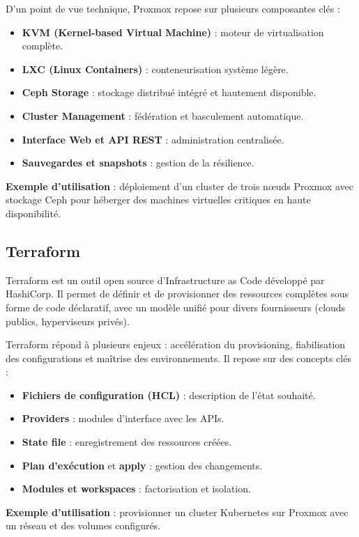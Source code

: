 D’un point de vue technique, Proxmox repose sur plusieurs composantes clés :
\begin{itemize}
    \item \textbf{KVM (Kernel-based Virtual Machine)} : moteur de virtualisation complète.
    \item \textbf{LXC (Linux Containers)} : conteneurisation système légère.
    \item \textbf{Ceph Storage} : stockage distribué intégré et hautement disponible.
    \item \textbf{Cluster Management} : fédération et basculement automatique.
    \item \textbf{Interface Web et API REST} : administration centralisée.
    \item \textbf{Sauvegardes et snapshots} : gestion de la résilience.
\end{itemize}

\textbf{Exemple d’utilisation} : déploiement d’un cluster de trois nœuds Proxmox avec stockage Ceph pour héberger des machines virtuelles critiques en haute disponibilité.

\subsection{Terraform}

Terraform est un outil open source d’Infrastructure as Code développé par HashiCorp. Il permet de définir et de provisionner des ressources complètes sous forme de code déclaratif, avec un modèle unifié pour divers fournisseurs (clouds publics, hyperviseurs privés).

Terraform répond à plusieurs enjeux : accélération du provisioning, fiabilisation des configurations et maîtrise des environnements. Il repose sur des concepts clés :
\begin{itemize}
    \item \textbf{Fichiers de configuration (HCL)} : description de l’état souhaité.
    \item \textbf{Providers} : modules d’interface avec les APIs.
    \item \textbf{State file} : enregistrement des ressources créées.
    \item \textbf{Plan d’exécution} et \textbf{apply} : gestion des changements.
    \item \textbf{Modules et workspaces} : factorisation et isolation.
\end{itemize}

\textbf{Exemple d’utilisation} : provisionner un cluster Kubernetes sur Proxmox avec un réseau et des volumes configurés.

